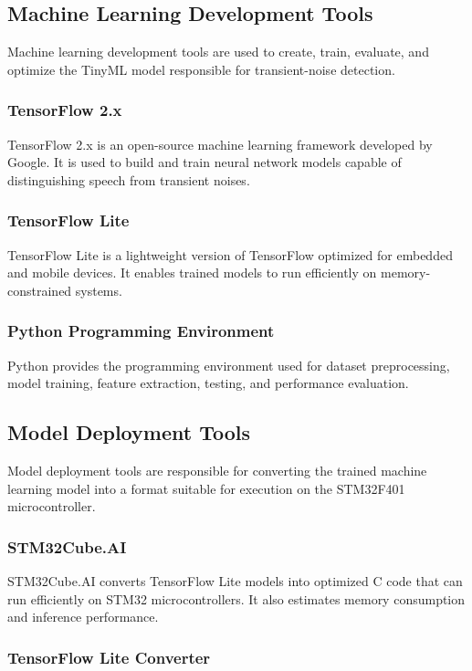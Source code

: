 \subsection{Machine Learning Development Tools}
Machine learning development tools are used to create, train, evaluate, and optimize the TinyML model responsible for transient-noise detection.

\subsubsection{TensorFlow 2.x}

TensorFlow 2.x is an open-source machine learning framework developed by Google. It is used to build and train neural network models capable of distinguishing speech from transient noises.

\subsubsection{TensorFlow Lite}

TensorFlow Lite is a lightweight version of TensorFlow optimized for embedded and mobile devices. It enables trained models to run efficiently on memory-constrained systems.

\subsubsection{Python Programming Environment}

Python provides the programming environment used for dataset preprocessing, model training, feature extraction, testing, and performance evaluation.

\subsection{Model Deployment Tools}
Model deployment tools are responsible for converting the trained machine learning model into a format suitable for execution on the STM32F401 microcontroller.

\subsubsection{STM32Cube.AI}

STM32Cube.AI converts TensorFlow Lite models into optimized C code that can run efficiently on STM32 microcontrollers. It also estimates memory consumption and inference performance.

\subsubsection{TensorFlow Lite Converter}

